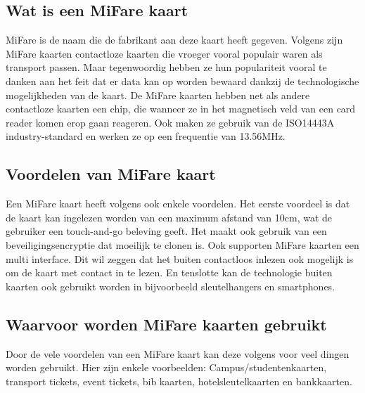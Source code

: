 \subsection{Wat is een MiFare kaart}
MiFare is de naam die de fabrikant aan deze kaart heeft gegeven. Volgens \textcite{Digitalid} zijn MiFare kaarten contactloze kaarten die vroeger vooral populair waren als transport passen. Maar tegenwoordig hebben ze hun populariteit vooral te danken aan het feit dat er data kan op worden bewaard dankzij de technologische mogelijkheden van de kaart.
De MiFare kaarten hebben net als andere contactloze kaarten een chip, die wanneer ze in het magnetisch veld van een card reader komen erop gaan reageren. Ook maken ze gebruik van de ISO14443A industry-standard en werken ze op een frequentie van 13.56MHz.

\subsection{Voordelen van MiFare kaart}
Een MiFare kaart heeft volgens \textcite{Printplast} ook enkele voordelen. Het eerste voordeel is dat de kaart kan ingelezen worden van een maximum afstand van 10cm, wat de gebruiker een touch-and-go beleving geeft.
Het maakt ook gebruik van een beveiligingsencryptie dat moeilijk te clonen is. Ook supporten MiFare kaarten een multi interface. Dit wil zeggen dat het buiten contactloos inlezen ook mogelijk is om de kaart met contact in te lezen. En tenslotte kan de technologie buiten kaarten ook gebruikt worden in bijvoorbeeld sleutelhangers en smartphones.

\subsection{Waarvoor worden MiFare kaarten gebruikt}
Door de vele voordelen van een MiFare kaart kan deze volgens \textcite{Digitalid} voor veel dingen worden gebruikt. Hier zijn enkele voorbeelden: Campus/studentenkaarten, transport tickets, event tickets, bib kaarten, hotelsleutelkaarten en bankkaarten.

